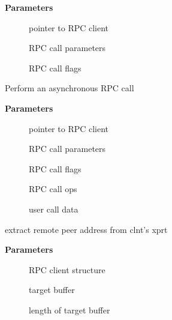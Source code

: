 \documentclass[a4paper,8pt,english]{sphinxmanual}
\begin{document}
\textbf{Parameters}
\begin{description}
\item[{}] \leavevmode
pointer to RPC client

\item[{}] \leavevmode
RPC call parameters

\item[{}] \leavevmode
RPC call flags

\end{description}

\begin{fulllineitems}
\label{networking/kapi:c.rpc_call_async}
Perform an asynchronous RPC call

\end{fulllineitems}


\textbf{Parameters}
\begin{description}
\item[{}] \leavevmode
pointer to RPC client

\item[{}] \leavevmode
RPC call parameters

\item[{}] \leavevmode
RPC call flags

\item[{}] \leavevmode
RPC call ops

\item[{}] \leavevmode
user call data

\end{description}

\begin{fulllineitems}
\label{networking/kapi:c.rpc_peeraddr}
extract remote peer address from clnt's xprt

\end{fulllineitems}


\textbf{Parameters}
\begin{description}
\item[{}] \leavevmode
RPC client structure

\item[{}] \leavevmode
target buffer

\item[{}] \leavevmode
length of target buffer

\end{description}
\end{document}

